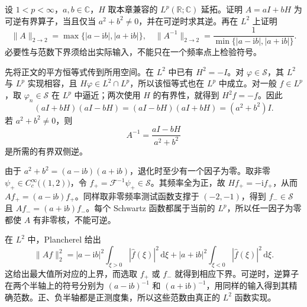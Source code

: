 \begin{exercise}\label{b2:ex:18-new-2}
设 \(1<p<\infty\)，\(a,b\in\mathbb C\)，\(H\) 取本章兼容的 \(L^p(\mathbb R;\mathbb C)\) 延拓。证明 \(A=aI+bH\) 为可逆有界算子，当且仅当 \(a^2+b^2\ne0\)，并在可逆时求其逆。再在 \(L^2\) 上证明
\[
 \|A\|_{2\to2}=\max\{|a-\mathrm ib|,|a+\mathrm ib|\},
 \quad
 \|A^{-1}\|_{2\to2}
 =\frac1{\min\{|a-\mathrm ib|,|a+\mathrm ib|\}}.
\]
必要性与范数下界须给出实际输入，不能只在一个频率点上检验符号。
\end{exercise}
\begin{solution}
先将正文的平方恒等式传到所用空间。在 \(L^2\) 中已有 \(H^2=-I\)。对 \(\varphi\in\mathcal S\)，其 \(L^2\) 与 \(L^p\) 实现相容，且 \(H\varphi\in L^2\cap L^p\)，所以该恒等式也在 \(L^p\) 中成立。对一般 \(f\in L^p\)，取 \(\varphi_n\in\mathcal S\) 在 \(L^p\) 中逼近；两次使用 \(H\) 的有界性，就得到 \(H^2f=-f\)。因此
\[
 (aI+bH)(aI-bH)=(aI-bH)(aI+bH)=(a^2+b^2)I.
\]
若 \(a^2+b^2\ne0\)，则
\[
 A^{-1}=\frac{aI-bH}{a^2+b^2}
\]
是所需的有界双侧逆。

由于 \(a^2+b^2=(a-\mathrm ib)(a+\mathrm ib)\)，退化时至少有一个因子为零。取非零 \(\psi_+\in C_c^\infty\bigl((1,2)\bigr)\)，令 \(f_+=\mathcal F^{-1}\psi_+\in\mathcal S\)。其频率全为正，故
\(Hf_+=-\mathrm if_+\)，从而 \(Af_+=(a-\mathrm ib)f_+\)。同样取非零频率测试函数支撑于 \((-2,-1)\)，得到 \(f_-\in\mathcal S\) 且
\(Af_-=(a+\mathrm ib)f_-\)。每个 Schwartz 函数都属于当前的 \(L^p\)，所以任一因子为零都使 \(A\) 有非零核，不能可逆。

在 \(L^2\) 中，Plancherel 给出
\[
 \|Af\|_2^2
 =|a-\mathrm ib|^2\int_{\xi>0}|\widehat f(\xi)|^2\,\mathrm d\xi
  +|a+\mathrm ib|^2\int_{\xi<0}|\widehat f(\xi)|^2\,\mathrm d\xi.
\]
这给出最大值所对应的上界，而选取 \(f_+\) 或 \(f_-\) 就得到相应下界。可逆时，逆算子在两个半轴上的符号分别为
\((a-\mathrm ib)^{-1}\) 和 \((a+\mathrm ib)^{-1}\)，用同样的输入得到其精确范数。正、负半轴都是正测度集，所以这些范数由真正的 \(L^2\) 函数实现。
\end{solution}

